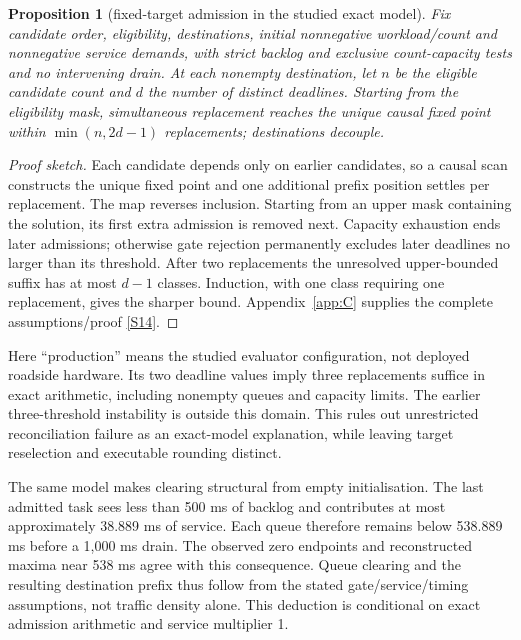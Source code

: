\documentclass[11pt,a4paper]{article}
\newtheorem{proposition}{Proposition}
\begin{document}
\begin{proposition}[fixed-target admission in the studied exact model]\label{prop:1}
Fix candidate order, eligibility, destinations, initial nonnegative workload/count and nonnegative service demands, with strict backlog and exclusive count-capacity tests and no intervening drain. At each nonempty destination, let $n$ be the eligible candidate count and $d$ the number of distinct deadlines. Starting from the eligibility mask, simultaneous replacement reaches the unique causal fixed point within $\min(n,2d-1)$ replacements; destinations decouple.\end{proposition}

\begin{proof}[Proof sketch]
Each candidate depends only on earlier candidates, so a causal scan constructs the unique fixed point and one additional prefix position settles per replacement. The map reverses inclusion. Starting from an upper mask containing the solution, its first extra admission is removed next. Capacity exhaustion ends later admissions; otherwise gate rejection permanently excludes later deadlines no larger than its threshold. After two replacements the unresolved upper-bounded suffix has at most $d-1$ classes. Induction, with one class requiring one replacement, gives the sharper bound. Appendix~\ref{app:C} supplies the complete assumptions/proof \hyperref[source-s14]{[S14]}.\end{proof}

Here ``production'' means the studied evaluator configuration, not deployed roadside hardware. Its two deadline values imply three replacements suffice in exact arithmetic, including nonempty queues and capacity limits. The earlier three-threshold instability is outside this domain. This rules out unrestricted reconciliation failure as an exact-model explanation, while leaving target reselection and executable rounding distinct.

The same model makes clearing structural from empty initialisation. The last admitted task sees less than 500 ms of backlog and contributes at most approximately 38.889 ms of service. Each queue therefore remains below 538.889 ms before a 1,000 ms drain. The observed zero endpoints and reconstructed maxima near 538 ms agree with this consequence. Queue clearing and the resulting destination prefix thus follow from the stated gate/service/timing assumptions, not traffic density alone. This deduction is conditional on exact admission arithmetic and service multiplier 1.
\end{document}
